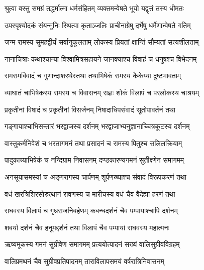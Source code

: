 
\textlink{}
\translink{}

\storymeta

\twolineshloka
{श्रुत्वा वस्तु समग्रं तद्धर्मात्मा धर्मसंहितम्}
{व्यक्तमन्वेषते भूयो यद्वृत्तं तस्य धीमतः} %

\twolineshloka
{उपस्पृश्योदकं संयन्मुनिः स्थित्वा कृताञ्जलिः}
{प्राचीनाग्रेषु दर्भेषु धर्मेणान्वेषते गतिम्} %

\twolineshloka
{जन्म रामस्य सुमहद्वीर्यं सर्वानुकूलताम्}
{लोकस्य प्रियतां क्षान्तिं सौम्यतां सत्यशीलताम्} %

\twolineshloka
{नानाचित्राः कथाश्चान्या विश्वामित्रसहायने}
{जानक्याश्च विवाहं च धनुषश्च विभेदनम्} %

\twolineshloka
{रामरामविवादं च गुणान्दाशरथेस्तथा}
{तथाभिषेकं रामस्य कैकेय्या दुष्टभावताम्} %

\twolineshloka
{व्याघातं चाभिषेकस्य रामस्य च विवासनम्}
{राज्ञः शोकं विलापं च परलोकस्य चाश्रयम्} %

\twolineshloka
{प्रकृतीनां विषादं च प्रकृतीनां विसर्जनम्}
{निषादाधिपसंवादं सूतोपावर्तनं तथा} %

\twolineshloka
{गङ्गायाश्चाभिसन्तारं भरद्वाजस्य दर्शनम्}
{भरद्वाजाभ्यनुज्ञानाच्चित्रकूटस्य दर्शनम्} %

\twolineshloka
{वास्तुकर्मनिवेशं च भरतागमनं तथा}
{प्रसादनं च रामस्य पितुश्च सलिलक्रियाम्} %

\twolineshloka
{पादुकाग्र्याभिषेकं च नन्दिग्राम निवासनम्}
{दण्डकारण्यगमनं सुतीक्ष्णेन समागमम्} %

\twolineshloka
{अनसूयासमस्यां च अङ्गरागस्य चार्पणम्}
{शूर्पणख्याश्च संवादं विरूपकरणं तथा} %

\twolineshloka
{वधं खरत्रिशिरसोरुत्थानं रावणस्य च}
{मारीचस्य वधं चैव वैदेह्या हरणं तथा} %

\twolineshloka
{राघवस्य विलापं च गृध्रराजनिबर्हणम्}
{कबन्धदर्शनं चैव पम्पायाश्चापि दर्शनम्} %

\twolineshloka
{शबर्या दर्शनं चैव हनूमद्दर्शनं तथा}
{विलापं चैव पम्पायां राघवस्य महात्मनः} %

\twolineshloka
{ऋष्यमूकस्य गमनं सुग्रीवेण समागमम्}
{प्रत्ययोत्पादनं सख्यं वालिसुग्रीवविग्रहम्} %

\twolineshloka
{वालिप्रमथनं चैव सुग्रीवप्रतिपादनम्}
{ताराविलापसमयं वर्षरात्रिनिवासनम्} %

